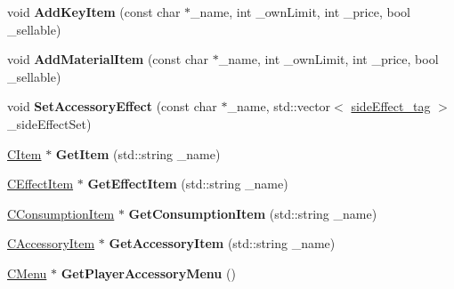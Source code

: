 \begin{DoxyCompactItemize}
\item 
void {\bfseries Add\+Key\+Item} (const char $\ast$\+\_\+name, int \+\_\+own\+Limit, int \+\_\+price, bool \+\_\+sellable)\hypertarget{class_c_item_manager_a2d8ec3a84fb41ebe5fe72249ed549581}{}\label{class_c_item_manager_a2d8ec3a84fb41ebe5fe72249ed549581}

\item 
void {\bfseries Add\+Material\+Item} (const char $\ast$\+\_\+name, int \+\_\+own\+Limit, int \+\_\+price, bool \+\_\+sellable)\hypertarget{class_c_item_manager_a6df0255f5727ec0a5f024598f5d78ba0}{}\label{class_c_item_manager_a6df0255f5727ec0a5f024598f5d78ba0}

\item 
void {\bfseries Set\+Accessory\+Effect} (const char $\ast$\+\_\+name, std\+::vector$<$ \hyperlink{structside_effect__tag}{side\+Effect\+\_\+tag} $>$ \+\_\+side\+Effect\+Set)\hypertarget{class_c_item_manager_ae29aab01bdf60439343c654533ad1131}{}\label{class_c_item_manager_ae29aab01bdf60439343c654533ad1131}

\item 
\hyperlink{class_c_item}{C\+Item} $\ast$ {\bfseries Get\+Item} (std\+::string \+\_\+name)\hypertarget{class_c_item_manager_a2f9bef94df4a3bbf13d207a176876ced}{}\label{class_c_item_manager_a2f9bef94df4a3bbf13d207a176876ced}

\item 
\hyperlink{class_c_effect_item}{C\+Effect\+Item} $\ast$ {\bfseries Get\+Effect\+Item} (std\+::string \+\_\+name)\hypertarget{class_c_item_manager_a0bfb4dfcc31ef901102c8f1afeb98ff2}{}\label{class_c_item_manager_a0bfb4dfcc31ef901102c8f1afeb98ff2}

\item 
\hyperlink{class_c_consumption_item}{C\+Consumption\+Item} $\ast$ {\bfseries Get\+Consumption\+Item} (std\+::string \+\_\+name)\hypertarget{class_c_item_manager_ae1cd036f91edf392444c7c97013c4cfc}{}\label{class_c_item_manager_ae1cd036f91edf392444c7c97013c4cfc}

\item 
\hyperlink{class_c_accessory_item}{C\+Accessory\+Item} $\ast$ {\bfseries Get\+Accessory\+Item} (std\+::string \+\_\+name)\hypertarget{class_c_item_manager_a8959913f4df6eaf0048f1c02cd161f39}{}\label{class_c_item_manager_a8959913f4df6eaf0048f1c02cd161f39}

\item 
\hyperlink{class_c_menu}{C\+Menu} $\ast$ {\bfseries Get\+Player\+Accessory\+Menu} ()\hypertarget{class_c_item_manager_ac9a179e48bb8b18030c4fa0803a1cf86}{}\label{class_c_item_manager_ac9a179e48bb8b18030c4fa0803a1cf86}


\end{DoxyCompactItemize}
